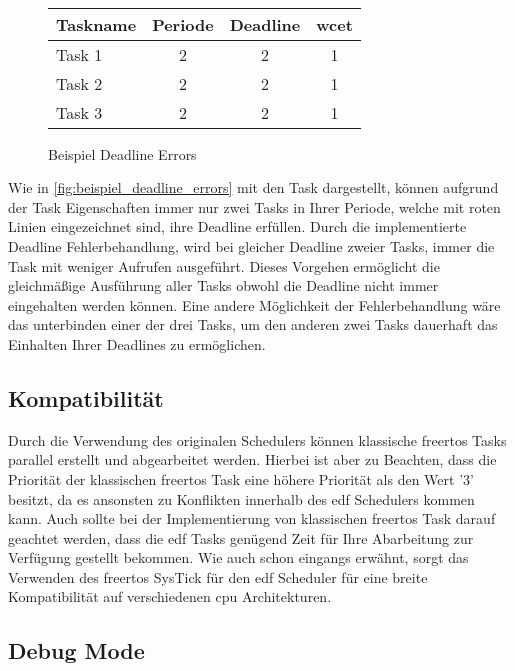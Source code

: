 \documentclass[../EDF Master Thesis.tex]{subfiles}
\begin{document}
\begin{figure}[H]
\begin{tikzpicture}
        \end{tikzpicture}\\
        \vspace {1cm}
        \begin{tabular}{l|c|c|c}
            Taskname & Periode & Deadline & \ac{wcet} \\
            \hline
            Task 1 & 2 & 2 & 1 \\
            Task 2 & 2 & 2 & 1 \\
            Task 3 & 2 & 2 & 1 
        \end{tabular}
        \caption{Beispiel Deadline Errors}
        \label{fig:beispiel_deadline_errors}
    \end{figure}

    Wie in \autoref{fig:beispiel_deadline_errors} mit den Task dargestellt, können aufgrund der Task Eigenschaften immer nur zwei Tasks in Ihrer Periode, welche mit roten Linien eingezeichnet sind, ihre Deadline erfüllen.
    Durch die implementierte Deadline Fehlerbehandlung, wird bei gleicher Deadline zweier Tasks, immer die Task mit weniger Aufrufen ausgeführt.
    Dieses Vorgehen ermöglicht die gleichmäßige Ausführung aller Tasks obwohl die Deadline nicht immer eingehalten werden können.
    Eine andere Möglichkeit der Fehlerbehandlung wäre das unterbinden einer der drei Tasks, um den anderen zwei Tasks dauerhaft das Einhalten Ihrer Deadlines zu ermöglichen.

\subsection{Kompatibilität}

    Durch die Verwendung des originalen Schedulers können klassische \ac{freertos} Tasks parallel erstellt und abgearbeitet werden.
    Hierbei ist aber zu Beachten, dass die Priorität der klassischen \ac{freertos} Task eine höhere Priorität als den Wert '3' besitzt, da es ansonsten zu Konflikten innerhalb des \ac{edf} Schedulers kommen kann.
    Auch sollte bei der Implementierung von klassischen \ac{freertos} Task darauf geachtet werden, dass die \ac{edf} Tasks genügend Zeit für Ihre Abarbeitung zur Verfügung gestellt bekommen.
    Wie auch schon eingangs erwähnt, sorgt das Verwenden des \ac{freertos} SysTick für den \ac{edf} Scheduler für eine breite Kompatibilität auf verschiedenen \ac{cpu} Architekturen.

\subsection{Debug Mode} \label{section:debug_mode}
\end{document}

